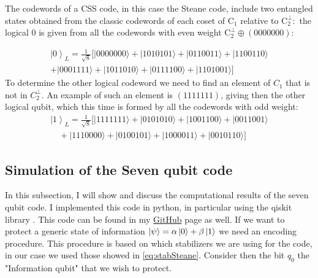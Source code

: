 The codewords of a CSS code, in this case the Steane code, include two entangled states obtained from the classic codewords of each coset of $\mathrm{C}_1$ relative to $\mathrm{C}_2^{\perp}:$ the logical 0 is given from all the codewords with even weight $\mathrm{C}_2^{\perp} \oplus(0000000)$:

$$
\begin{array}{r}
\left|0\right\rangle_L=\frac{1}{\sqrt{8}}[|0000000\rangle+|1010101\rangle+|0110011\rangle+|1100110\rangle \\
+|0001111\rangle+|1011010\rangle+|0111100\rangle+|1101001\rangle]
\end{array}
$$
To determine the other logical codeword we need to find an element of $C_{1}$ that is not in $C^{\perp}_{2}$. An example of such an element is $(1111111)$, giving then the other logical qubit, which this time is formed by all the codewords with odd weight:
$$
\begin{array}{r}
\left|1\right\rangle_L=\frac{1}{\sqrt{8}}[|1111111\rangle+|0101010\rangle+|1001100\rangle+|0011001\rangle \\
\quad+|1110000\rangle+|0100101\rangle+|1000011\rangle+|0010110\rangle]
\end{array}
$$
\subsection{Simulation of the Seven qubit code}
In this subsection, I will show and discuss the computational results of the seven qubit code. I implemented this code in python, in particular using the qiskit library \cite{Qiskit}. This code can be found in my \href{https://github.com/AlexsashaV4/bachelor_thesis_QEC.git}{GitHub} page as well. 
If we want to protect a generic state of information $\ket{\psi}=\alpha\ket{0} + \beta\ket{1}$ we need an encoding procedure. This procedure is based on which stabilizers we are using for the code, in our case we used those showed in \ref{eq:stabSteane}.  
Consider then the bit $q_0$ the "Information qubit" that we wish to protect. 


